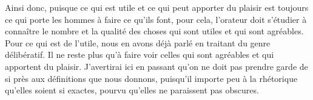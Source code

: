 \bigbreak

Ainsi donc, puisque ce qui est utile et ce qui peut apporter du plaisir est toujours ce qui porte les hommes à faire ce qu'ils
font, pour cela, l'orateur doit s'étudier à connaître le nombre et la qualité des choses qui sont utiles et qui sont
agréables. Pour ce qui est de l'utile, nous en avons déjà parlé en traitant du genre délibératif. Il ne reste plus qu'à faire
voir celles qui sont agréables et qui apportent du plaisir. J'avertirai ici en passant qu'on ne doit pas prendre garde de si
près aux définitions que nous donnons, puisqu'il importe peu à la rhétorique qu'elles soient si exactes, pourvu qu'elles ne
paraissent pas obscures. 
